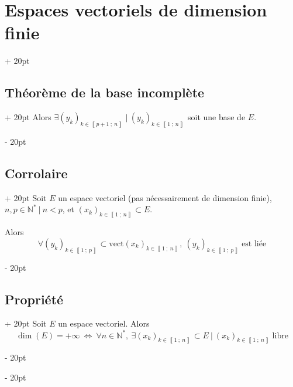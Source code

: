 \documentclass[a4paper, 12pt, twoside]{article}
\newcommand{\N}{\mathbb{N}} %
\newcommand{\nset}[2]{\left\llbracket #1\ ;\ #2 \right\rrbracket}
\newcommand{\ssi}{\ \Leftrightarrow \ }
\newcommand{\ind}[1][20pt]{\advance\leftskip + #1}
\newcommand{\deind}[1][20pt]{\advance\leftskip - #1}
\newenvironment{indt}[2][20pt]{#2 \par \ind[#1]}{\par \deind} %
\begin{document}
\begin{indt}{\section{Espaces vectoriels de dimension finie}}
\begin{indt}{\subsection{Théorème de la base incomplète}}
            Alors $\exists (y_k)_{k \in \nset{p + 1}{n}} \ |\ (y_k)_{k \in \nset 1 n}$ soit une base de $E$.
        \end{indt}
        
        \vspace{12pt}
        
        \begin{indt}{\subsection{Corrolaire}}
            Soit $E$ un espace vectoriel (pas nécessairement de dimension finie), $n, p \in \N^*\ |\ n < p$, et $(x_k)_{k \in \nset 1 n} \subset E$.
            
            Alors
                \[ \forall (y_k)_{k \in \nset 1 p} \subset \mathrm{vect}(x_k)_{k \in \nset 1 n},\ (y_k)_{k \in \nset 1 p}\ \text{est liée} \]
        \end{indt}
        
        \vspace{12pt}
        
        \begin{indt}{\subsection{Propriété}}
            Soit $E$ un espace vectoriel. Alors
                \[ \dim(E) = +\infty \ssi \forall n \in \N^*,\ \exists (x_k)_{k \in \nset 1 n} \subset E\ |\ (x_k)_{k \in \nset 1 n}\ \text{libre} \]
        \end{indt}
        
    \end{indt}
    
    \vspace{12pt}
    
\end{document}
